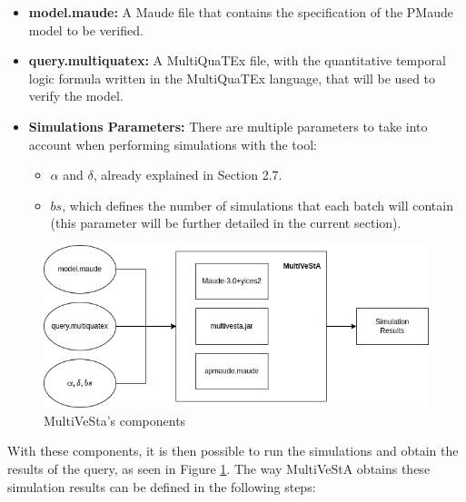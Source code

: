 \begin{itemize}
    \item \textbf{model.maude:} A Maude file that contains the specification of the PMaude model to be verified.
    \item \textbf{query.multiquatex:} A MultiQuaTEx file, with the quantitative temporal logic formula written in the MultiQuaTEx language, that will be used to verify the model.
    \item \textbf{Simulations Parameters:} There are multiple parameters to take into account when performing simulations with the tool:
    \begin{itemize}
        \item $\alpha$ and $\delta$, already explained in Section 2.7.
        \item $bs$, which defines the number of simulations that each batch will contain (this parameter will be further detailed in the current section).
    \end{itemize}
\end{itemize}
\begin{figure}[H]
    \centering
    \includegraphics[scale = 0.5]{images/multi1.png}
    \caption{MultiVeSta's components}
    \label{fig:multi1}
\end{figure}
With these components, it is then possible to run the simulations and obtain the results of the query, as seen in Figure \ref{fig:multi1}. The way MultiVeStA obtains these simulation results can be defined in the following steps:
